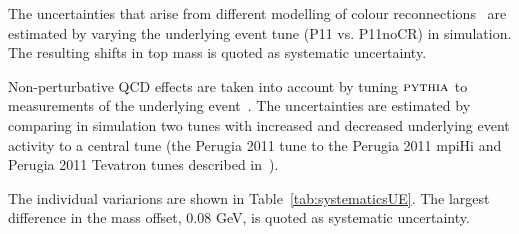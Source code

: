 \begin{description}[wide=\parindent]
\item [Colour reconnection.] The uncertainties that arise from different modelling of colour
reconnections~\cite{Wicke:2008iz} are estimated by varying the underlying event tune (P11 vs. P11noCR) in simulation.
The resulting shifts in top mass is quoted as systematic uncertainty.

\item [Underlying event.] Non-perturbative QCD effects are taken into account by tuning $\textsc {pythia}$ to
measurements of the underlying event~\cite{Chatrchyan:2011id}. The uncertainties are estimated by comparing in
simulation two tunes with increased and decreased underlying event activity to a central tune (the Perugia 2011 tune to
the Perugia 2011 mpiHi and Perugia 2011 Tevatron tunes described in~\cite{Skands:2010ak}).

The individual variarions are shown in Table~\ref{tab:systematicsUE}. The largest difference in the mass offset,
0.08 GeV, is quoted as systematic uncertainty. 

\item [Pileup.]


\end{description}
